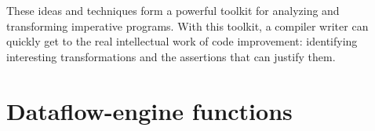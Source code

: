 \documentclass[blockstyle,preprint,nocopyrightspace]{sigplanconf}
\begin{document}
These ideas and techniques form a powerful toolkit for
analyzing and transforming imperative programs.
With this toolkit, a compiler writer can quickly get to the real
intellectual work of code improvement: identifying interesting
transformations and the assertions that can justify them.

\makeatother

\providecommand\includeftpref{\relax} %


\clearpage

\appendix

\section{Dataflow-engine functions}
\end{document}
